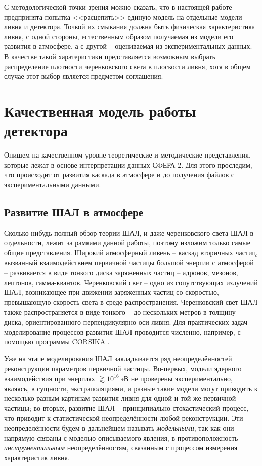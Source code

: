 С методологической точки зрения можно сказать, что в настоящей работе предпринята попытка <<расцепить>> единую модель на отдельные модели ливня и детектора. Точкой их смыкания должна быть физическая характеристика ливня, с одной стороны, естественным образом получаемая из модели его развития в атмосфере, а с другой -- оцениваемая из экспериментальных данных. В качестве такой харатеристики представляется возможным выбрать распределение плотности черенковского света в плоскости ливня, хотя в общем случае этот выбор является предметом соглашения.


\section{Качественная модель работы детектора}
\label{sec:sphere-2-model}

Опишем на качественном уровне теоретические и методические представления, которые лежат в основе интерпретации данных СФЕРА-2. Для этого проследим, что происходит от развития каскада в атмосфере и до получения файлов с экспериментальными данными.

\subsection{Развитие ШАЛ в атмосфере}

Сколько-нибудь полный обзор теории ШАЛ, и даже черенковского света ШАЛ в отдельности, лежит за рамками данной работы, поэтому изложим только самые общие представления. Широкий атмосферный ливень -- каскад вторичных частиц, вызванный взаимодействием первичной частицы большой энергии с атмосферой -- развивается в виде тонкого диска заряженных частиц -- адронов, мезонов, лептонов, гамма-квантов. Черенковский свет -- одно из сопутствующих излучений ШАЛ, возникающее при движении заряженных частиц со скоростью, превышающую скорость света в среде распространения. Черенковский свет ШАЛ также распространяется в виде тонкого -- до нескольких метров в толщину -- диска, ориентированного перпендикулярно оси ливня. Для практических задач моделирование процессов развития ШАЛ проводится численно, например, с помощью программы CORSIKA \cite{CORSIKA-report}.

Уже на этапе моделирования ШАЛ закладывается ряд неопределённостей реконструкции параметров первичной частицы. Во-первых, модели ядерного взаимодействия при энергиях $\gtrapprox 10^{16}~\text{эВ}$ не проверены экспериментально, являясь, в сущности, экстраполяциями, и разные такие модели могут приводить к несколько разным картинам развития ливня для одной и той же первичной частицы; во-вторых, развитие ШАЛ -- принципиально стохастический процесс, что приводит к статистической неопределённости любой реконструкции. Эти неопределённости будем в дальнейшем называть \textit{модельными}, так как они напрямую связаны с моделью описываемого явления, в противоположность \textit{инструментальным} неопределённостям, связанным с процессом измерения характеристик ливня.

